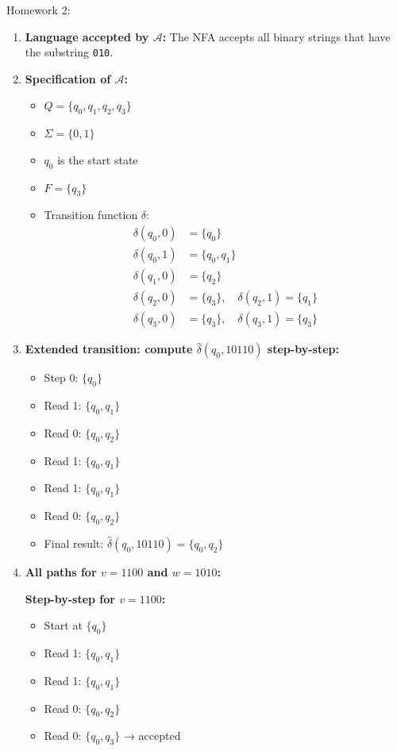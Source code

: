 \documentclass{article}
\theoremstyle{theorem}
\theoremstyle{definition}
\theoremstyle{remark}
\begin{document}
Homework 2: 

\begin{enumerate}
    \item \textbf{Language accepted by $\mathcal{A}$:}  
    The NFA accepts all binary strings that have the substring \texttt{010}.

    \item \textbf{Specification of $\mathcal{A}$:}  
    \begin{itemize}
        \item $Q = \{q_0, q_1, q_2, q_3\}$
        \item $\Sigma = \{0, 1\}$
        \item $q_0$ is the start state
        \item $F = \{q_3\}$
        \item Transition function $\delta$:
        \begin{align*}
            \delta(q_0, 0) &= \{q_0\} \\
            \delta(q_0, 1) &= \{q_0, q_1\} \\
            \delta(q_1, 0) &= \{q_2\} \\
            \delta(q_2, 0) &= \{q_3\}, \quad \delta(q_2, 1) = \{q_1\} \\
            \delta(q_3, 0) &= \{q_3\}, \quad \delta(q_3, 1) = \{q_3\}
        \end{align*}
    \end{itemize}

    \item \textbf{Extended transition: compute $\hat{\delta}(q_0, 10110)$ step-by-step:}
    \begin{itemize}
        \item Step 0: $\{q_0\}$
        \item Read 1: $\{q_0, q_1\}$
        \item Read 0: $\{q_0, q_2\}$
        \item Read 1: $\{q_0, q_1\}$
        \item Read 1: $\{q_0, q_1\}$
        \item Read 0: $\{q_0, q_2\}$
        \item Final result: $\hat{\delta}(q_0, 10110) = \{q_0, q_2\}$
    \end{itemize}

    \item \textbf{All paths for $v = 1100$ and $w = 1010$:}

    \textbf{Step-by-step for $v = 1100$:}
    \begin{itemize}
        \item Start at $\{q_0\}$
        \item Read 1: $\{q_0, q_1\}$
        \item Read 1: $\{q_0, q_1\}$
        \item Read 0: $\{q_0, q_2\}$
        \item Read 0: $\{q_0, q_3\}$ → accepted
    \end{itemize}


\end{enumerate}
\end{document}
